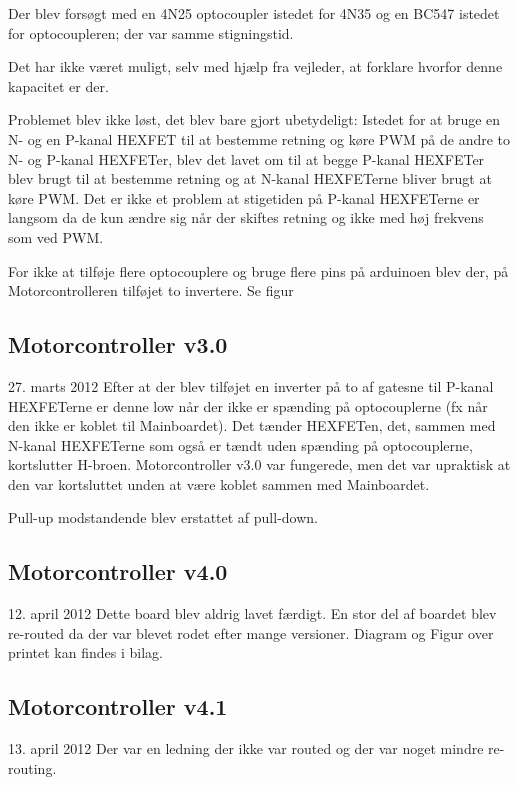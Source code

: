 \documentclass[a4paper,oneside,article,danish,table]{memoir}
\newcommand{\boarddate}[1]{\textcolor{blue!80!black}{#1}}
\begin{document}
Der blev forsøgt med en 4N25 optocoupler istedet for 4N35 og en BC547 istedet for optocoupleren; der var samme stigningstid.

Det har ikke været muligt, selv med hjælp fra vejleder, at forklare hvorfor denne kapacitet er der.

Problemet blev ikke løst, det blev bare gjort ubetydeligt: Istedet for at bruge en N- og en P-kanal HEXFET til at bestemme retning og køre PWM på de andre to N- og P-kanal HEXFETer, blev det lavet om til at begge P-kanal HEXFETer blev brugt til at bestemme retning og at N-kanal HEXFETerne bliver brugt at køre PWM. Det er ikke et problem at stigetiden på P-kanal HEXFETerne er langsom da de kun ændre sig når der skiftes retning og ikke med høj frekvens som ved PWM.

For ikke at tilføje flere optocouplere og bruge flere pins på arduinoen blev der, på Motorcontrolleren tilføjet to invertere. Se figur 
\subsection{Motorcontroller v3.0}
\boarddate{27. marts 2012}
Efter at der blev tilføjet en inverter på to af gatesne til P-kanal HEXFETerne er denne low når der ikke er spænding på optocouplerne (fx når den ikke er koblet til Mainboardet). Det tænder HEXFETen, det, sammen med N-kanal HEXFETerne som også er tændt uden spænding på optocouplerne, kortslutter H-broen. Motorcontroller v3.0 var fungerede, men det var upraktisk at den var kortsluttet unden at være koblet sammen med Mainboardet.

Pull-up modstandende blev erstattet af pull-down.
\subsection{Motorcontroller v4.0}
\boarddate{12. april 2012} Dette board blev aldrig lavet færdigt. En stor del af boardet blev re-routed da der var blevet rodet efter mange versioner. Diagram og Figur over printet kan findes i bilag. 

\subsection{Motorcontroller v4.1}
\boarddate{13. april 2012}
Der var en ledning der ikke var routed og der var noget mindre re-routing.
\end{document}
